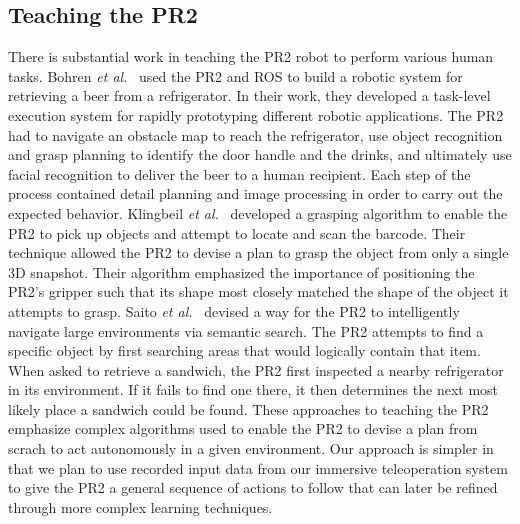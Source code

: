 \documentclass{sig-alternate}
\begin{document}
\subsection{Teaching the PR2}
\indent There is substantial work in teaching the PR2 robot to perform various human tasks. Bohren \textit{et al.}~\cite{beer} used the PR2 and ROS to build a robotic system for retrieving a beer from a refrigerator. In their work, they developed a task-level execution system for rapidly prototyping different robotic applications. The PR2 had to navigate an obstacle map to reach the refrigerator, use object recognition and grasp planning to identify the door handle and the drinks, and ultimately use facial recognition to deliver the beer to a human recipient. Each step of the process contained detail planning and image processing in order to carry out the expected behavior. Klingbeil \textit{et al.}~\cite{groceries} developed a grasping algorithm to enable the PR2 to pick up objects and attempt to locate and scan the barcode. Their technique allowed the PR2 to devise a plan to grasp the object from only a single 3D snapshot. Their algorithm emphasized the importance of positioning the PR2's gripper such that its shape most closely matched the shape of the object it attempts to grasp. Saito \textit{et al.}~\cite{subway} devised a way for the PR2 to intelligently navigate large environments via semantic search. The PR2 attempts to find a specific object by first searching areas that would logically contain that item. When asked to retrieve a sandwich, the PR2 first inspected a nearby refrigerator in its environment. If it fails to find one there, it then determines the next most likely place a sandwich could be found. These approaches to teaching the PR2 emphasize complex algorithms used to enable the PR2 to devise a plan from scrach to act autonomously in a given environment. Our approach is simpler in that we plan to use recorded input data from our immersive teleoperation system to give the PR2 a general sequence of actions to follow that can later be refined through more complex learning techniques.
\end{document}
